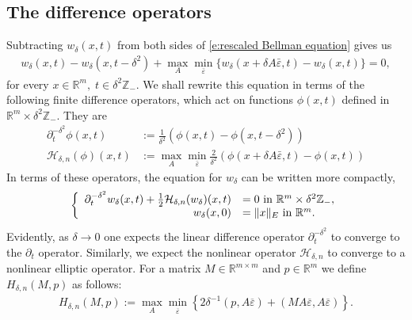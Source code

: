\documentclass[reqno]{amsart}
\numberwithin{equation}{section}
\begin{document}
    


\subsection{The difference operators} Subtracting $w_\delta(x,t)$ from both sides of \eqref{e:rescaled Bellman equation} gives us 
\begin{align*}
    w_\delta(x,t)-w_\delta(x,t-\delta^2) +  \max \limits_A \min \limits_{\bar \varepsilon} \{ w_\delta(x+\delta A\bar \varepsilon,t)-w_\delta(x,t) \} = 0,
\end{align*}
for every $x\in\mathbb{R}^m,\;t\in \delta^2\mathbb{Z}_-$. We shall rewrite this equation in terms of the following finite difference operators, which act on functions $\phi(x,t)$ defined in $\mathbb{R}^m\times \delta^2\mathbb{Z}_-$. They are
\begin{align*}
  \partial^{-\delta^2}_t \phi(x,t) & := \frac{1}{\delta^2}(\phi(x,t)-\phi(x,t-\delta^2))  \\ 
  \mathcal{H}_{\delta,n}(\phi)(x,t) & := \max \limits_A \min \limits_{\bar \varepsilon}  \tfrac{2}{\delta^2}(\phi(x+\delta A\bar \varepsilon,t)-\phi(x,t) ) 
\end{align*}
 In terms of these operators, the equation for $w_\delta$ can be written more compactly,
\begin{align}\label{e:rescaled value function terminal value problem}
  \left \{ \begin{array}{rl} \partial^{-\delta^2}_t w_\delta(x,t)+ \tfrac{1}{2}\mathcal{H}_{\delta,n}(w_\delta)(x,t) & = 0 \textnormal{ in } \mathbb{R}^m \times \delta^2 \mathbb{Z}_-,\\
  w_\delta(x,0) & = \|x\|_E \text{ in } \mathbb{R}^m.\end{array}\right.
\end{align}
Evidently, as $\delta \to 0$ one expects the linear difference operator $\partial^{-\delta^2}_t$ to converge to the $\partial_t$ operator. Similarly, we expect the nonlinear operator $\mathcal{H}_{\delta,n}$ to converge to a nonlinear elliptic operator.  For a matrix $M\in\mathbb{R}^{m\times m}$ and $p\in\mathbb{R}^m$ we define $H_{\delta,n}(M,p)$ as follows:
\begin{align}\label{e:definition of the auxiliary operator H delta n}
  H_{\delta,n}(M,p) := \max_A\min_{\overline\varepsilon}\left \{ 2\delta^{-1}(p,A\overline\varepsilon) + (M A\overline\varepsilon,A\overline\varepsilon) \right \}.
\end{align}
\end{document}
